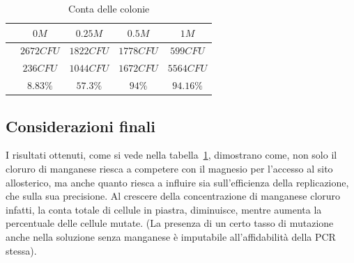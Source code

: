 	\begin{table}[H]
		\centering
		\begin{tabular}{|c|c|c|c|c|}
			\hline
			\makecell{Concentrazione di \emph{$MnCl_2$}} & $0M$ & $0.25M$ & $0.5M$ & $1M$\\
			\hline
			\makecell{Conta totale} & $2672CFU$ & $1822CFU$ & $1778CFU$ & $599CFU$ \\
			\hline
			\makecell{Colonie mutate} & $236CFU$ & $1044CFU$ & $1672CFU$ & $5564CFU$\\
			\hline
			\makecell{Tasso di mutazione} & $8.83\%$ & $57.3\%$ & $94\%$ & $94.16\%$\\
			\hline
		\end{tabular}
		\caption{Conta delle colonie}
		\label{tab}
	\end{table}

	\subsection*{Considerazioni finali}
	I risultati ottenuti, come si vede nella tabella~\ref{tab}, dimostrano come, non solo il cloruro di manganese riesca a competere con il magnesio per l'accesso al sito allosterico,
        ma anche quanto riesca a influire sia sull'efficienza della replicazione, che sulla sua precisione.
        Al crescere della concentrazione di manganese cloruro infatti, la conta totale di cellule in piastra, diminuisce, mentre aumenta la percentuale delle cellule mutate.
        (La presenza di un certo tasso di mutazione anche nella soluzione senza manganese è imputabile all'affidabilità della PCR stessa).
